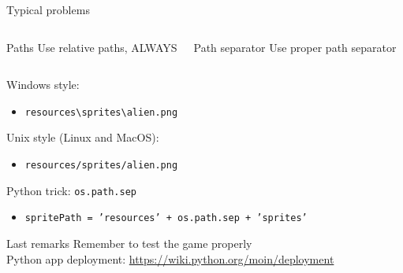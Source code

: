 \documentclass[10pt,compress]{beamer} %
\begin{document}
\begin{frame}{Typical problems}
    \begin{columns}
		\begin{alertblock}{Paths}
		Use relative paths, ALWAYS
		\end{alertblock}

		\begin{alertblock}{Path separator}
		Use proper path separator
		\end{alertblock}
    	\end{columns}

		\bigskip

		Windows style:
		\begin{itemize}
		\item \texttt{resources\textbackslash sprites\textbackslash alien.png}
		\end{itemize}

		Unix style (Linux and MacOS):
		\begin{itemize}
		\item \texttt{resources/sprites/alien.png}
		\end{itemize}

		Python trick: \texttt{os.path.sep}
		\begin{itemize}
			\item \texttt{spritePath = 'resources' + os.path.sep + 'sprites'}
		\end{itemize}
\end{frame}

\begin{frame}{Last remarks}
	Remember to test the game properly \\
	\bigskip
	Python app deployment: \url{https://wiki.python.org/moin/deployment}
\end{frame}
\end{document}
